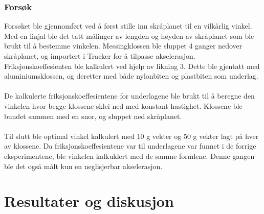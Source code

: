 \documentclass[10pt,a4paper]{report}
\begin{document}
\subsection*{Forsøk}
Forsøket ble gjennomført ved å først stille inn skråplanet til en vilkårlig vinkel. Med en linjal ble det tatt målinger av lengden og høyden av skråplanet som ble brukt til å bestemme vinkelen. Messingklossen ble sluppet 4 ganger nedover skråplanet, og importert i Tracker for å tilpasse akselerasjon. Friksjonskoeffesienten ble kalkulert ved hjelp av likning 3. Dette ble gjentatt med aluminiumsklossen, og deretter med både nylonbiten og plastbiten som underlag. \\
\\De kalkulerte friksjonskoeffesientene for underlagene ble brukt til å beregne den vinkelen hvor begge klossene sklei ned med konstant hastighet. Klossene ble bundet sammen med en snor, og sluppet ned skråplanet.\\
\\Til slutt ble optimal vinkel kalkulert med 10 g vekter og 50 g vekter lagt på hver av klossene. Da friksjonskoeffesientene var til underlagene var funnet i de forrige eksperimentene, ble vinkelen kalkuklert med de samme formlene. Denne gangen ble det også målt kun en neglisjerbar akselerasjon.


{\let\clearpage\relax\chapter*{Resultater og diskusjon}}
\end{document}
